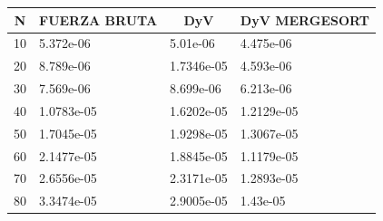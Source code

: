 \label{tabla_comp}
\begin{center}
\begin{longtable}{l|l|l|l}
\multicolumn{1}{c}{\textbf{N}} & \multicolumn{1}{c}{\textbf{FUERZA BRUTA}} & \multicolumn{1}{c}{\textbf{DyV}} & \multicolumn{1}{c}{\textbf{DyV MERGESORT}} \\
\hline
10                                                     & 5.372e-06                                                         & 5.01e-06                                                 & 4.475e-06                                                          \\
20                                                     & 8.789e-06                                                         & 1.7346e-05                                               & 4.593e-06                                                          \\
30                                                     & 7.569e-06                                                         & 8.699e-06                                                & 6.213e-06                                                          \\
40                                                     & 1.0783e-05                                                        & 1.6202e-05                                               & 1.2129e-05                                                         \\
50                                                     & 1.7045e-05                                                        & 1.9298e-05                                               & 1.3067e-05                                                         \\
60                                                     & 2.1477e-05                                                        & 1.8845e-05                                               & 1.1179e-05                                                         \\
70                                                     & 2.6556e-05                                                        & 2.3171e-05                                               & 1.2893e-05                                                         \\
80                                                     & 3.3474e-05                                                        & 2.9005e-05                                               & 1.43e-05                                                           \\

\end{longtable}
\end{center}
